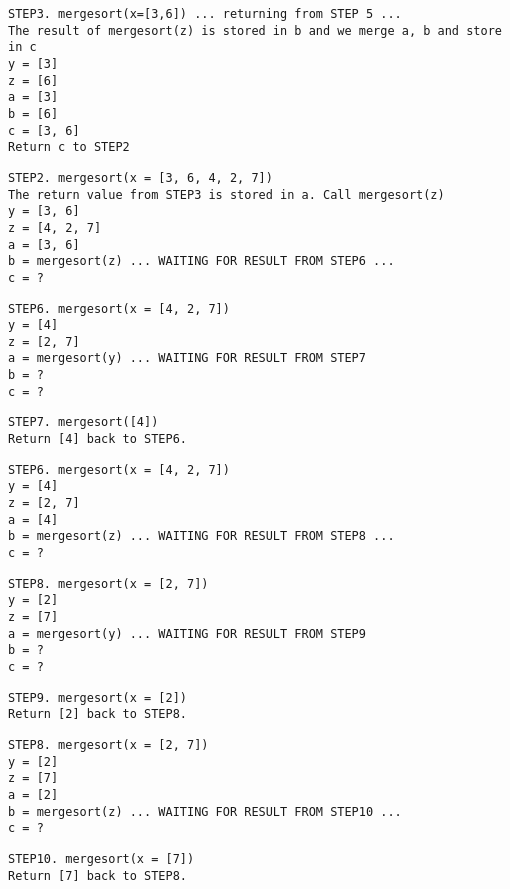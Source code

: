 \begin{Verbatim}[frame=single, fontsize=\footnotesize]
STEP3. mergesort(x=[3,6]) ... returning from STEP 5 ...
The result of mergesort(z) is stored in b and we merge a, b and store in c 
y = [3]
z = [6]
a = [3]
b = [6]
c = [3, 6]
Return c to STEP2
\end{Verbatim}

\begin{Verbatim}[frame=single, fontsize=\footnotesize]
STEP2. mergesort(x = [3, 6, 4, 2, 7])
The return value from STEP3 is stored in a. Call mergesort(z)
y = [3, 6]
z = [4, 2, 7]
a = [3, 6]
b = mergesort(z) ... WAITING FOR RESULT FROM STEP6 ...
c = ?
\end{Verbatim}

\begin{Verbatim}[frame=single, fontsize=\footnotesize]
STEP6. mergesort(x = [4, 2, 7])
y = [4]
z = [2, 7]
a = mergesort(y) ... WAITING FOR RESULT FROM STEP7
b = ?
c = ?
\end{Verbatim}

\begin{Verbatim}[frame=single, fontsize=\footnotesize]
STEP7. mergesort([4])
Return [4] back to STEP6.
\end{Verbatim}

\begin{Verbatim}[frame=single, fontsize=\footnotesize]
STEP6. mergesort(x = [4, 2, 7])
y = [4]
z = [2, 7]
a = [4]
b = mergesort(z) ... WAITING FOR RESULT FROM STEP8 ...
c = ? 
\end{Verbatim}

\begin{Verbatim}[frame=single, fontsize=\footnotesize]
STEP8. mergesort(x = [2, 7])
y = [2]
z = [7]
a = mergesort(y) ... WAITING FOR RESULT FROM STEP9
b = ?
c = ?
\end{Verbatim}

\begin{Verbatim}[frame=single, fontsize=\footnotesize]
STEP9. mergesort(x = [2])
Return [2] back to STEP8.
\end{Verbatim}

\begin{Verbatim}[frame=single, fontsize=\footnotesize]
STEP8. mergesort(x = [2, 7])
y = [2]
z = [7]
a = [2]
b = mergesort(z) ... WAITING FOR RESULT FROM STEP10 ...
c = ?
\end{Verbatim}

\begin{Verbatim}[frame=single, fontsize=\footnotesize]
STEP10. mergesort(x = [7])
Return [7] back to STEP8.
\end{Verbatim}


